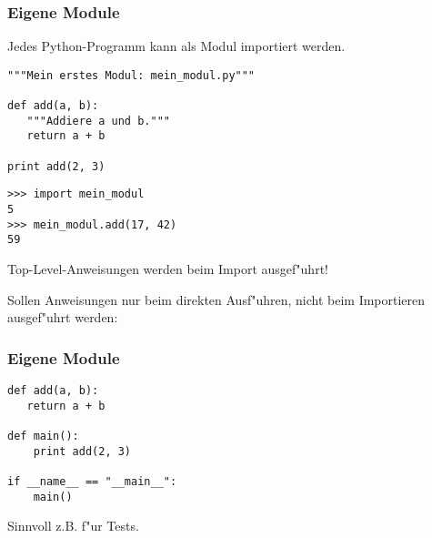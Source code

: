 \begin{frame}[fragile]
\frametitle{Eigene Module}
Jedes Python-Programm kann als Modul importiert werden.
\begin{lstlisting}[style=Python]
"""Mein erstes Modul: mein_modul.py"""

def add(a, b):
   """Addiere a und b."""
   return a + b

print add(2, 3)
\end{lstlisting}
\begin{lstlisting}[style=Shell]
>>> import mein_modul
5
>>> mein_modul.add(17, 42)
59
\end{lstlisting}
Top-Level-Anweisungen werden beim Import ausgef"uhrt!
\end{frame}

\begin{frame}[fragile]
Sollen Anweisungen nur beim direkten Ausf"uhren, nicht beim Importieren ausgef"uhrt werden:
\frametitle{Eigene Module}
\vspace{3mm}
\begin{lstlisting}[style=Python]
def add(a, b):
   return a + b

def main():
    print add(2, 3)

if __name__ == "__main__":
    main()
\end{lstlisting}
Sinnvoll z.B. f"ur Tests.
\end{frame}

